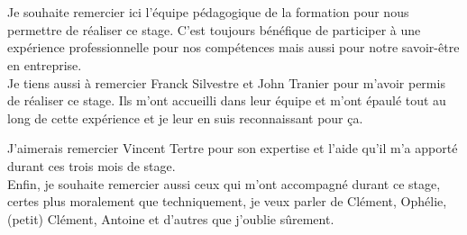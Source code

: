 \thispagestyle{empty}
\chapter*{}
\begin{flushright}
  \begin{minipage}[t]{0.6\textwidth}
	Je souhaite remercier ici l'équipe pédagogique de la formation pour nous
	permettre de réaliser ce stage. C'est toujours bénéfique de participer à une
	expérience professionnelle pour nos compétences mais aussi pour notre
	savoir-être en entreprise.\\

	Je tiens aussi à remercier Franck {\sc Silvestre} et John {\sc Tranier} pour
	m'avoir permis de réaliser ce stage. Ils m'ont accueilli dans leur équipe et
	m'ont épaulé tout au long de cette expérience et je leur en suis
	reconnaissant pour ça.
	
	J'aimerais remercier Vincent {\sc Tertre} pour son expertise et l'aide qu'il
	m'a apporté durant ces trois mois de stage.\\

	Enfin, je souhaite remercier aussi ceux qui m'ont accompagné durant ce
	stage, certes plus moralement que techniquement, je veux parler de Clément,
	Ophélie, (petit) Clément, Antoine et d'autres que j'oublie sûrement.
  \end{minipage}
\end{flushright}
